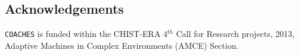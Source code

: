 \documentclass{llncs}
\def\coaches{{\tt COACHES} }
\begin{document}










\subsection*{Acknowledgements}

\coaches is funded within the CHIST-ERA 4$^{th}$ Call for Research projects, 2013,
Adaptive Machines in Complex Environments (AMCE) Section.




\end{document}
